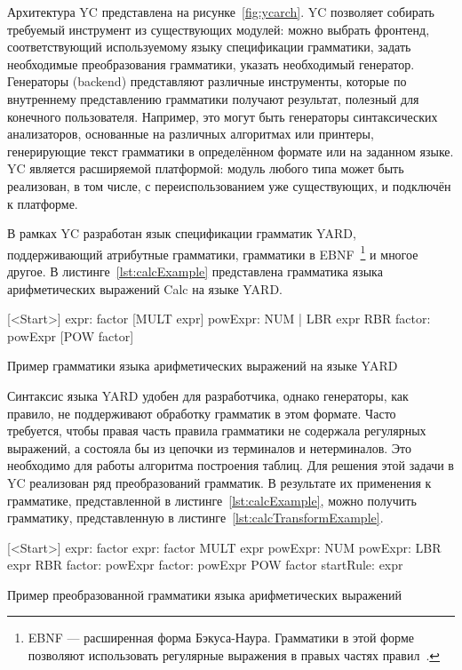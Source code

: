         
    Архитектура YC представлена на рисунке~\ref{fig:ycarch}. YC позволяет собирать требуемый инструмент из существующих модулей: можно выбрать фронтенд, соответствующий используемому языку спецификации грамматики, задать необходимые преобразования грамматики, указать необходимый генератор. Генераторы (backend) представляют различные инструменты, которые по внутреннему представлению грамматики получают результат, полезный для конечного пользователя. Например, это могут быть генераторы синтаксических анализаторов, основанные на различных алгоритмах или принтеры, генерирующие текст грамматики в определённом формате или на заданном языке. YC является расширяемой платформой: модуль любого типа может быть реализован, в том числе, с переиспользованием уже существующих, и подключён к платформе.  

    В рамках YC разработан язык спецификации грамматик YARD, поддерживающий атрибутные грамматики, грамматики в EBNF~\footnote{EBNF --- расширенная форма Бэкуса-Наура. Грамматики в этой форме позволяют использовать регулярные выражения в правых частях правил~\cite{EBNFISO}.} и многое другое. В листинге~\ref{lst:calcExample} представлена грамматика языка арифметических выражений Calc на языке YARD.  

\begin{listing}
    \begin{pyglist}[numbers=left,numbersep=5pt]
    
    [<Start>]
    expr: factor [MULT expr]
    powExpr: NUM | LBR expr RBR
    factor: powExpr [POW factor]
    
\end{pyglist}
\caption{Пример грамматики языка арифметических выражений на языке YARD}
\label{lst:calcExample}
\end{listing}


    Синтаксис языка YARD удобен для разработчика, однако генераторы, как правило, не поддерживают обработку грамматик в этом формате. Часто требуется, чтобы правая часть правила  грамматики не содержала регулярных выражений, а состояла бы из цепочки из терминалов и нетерминалов. Это необходимо для работы алгоритма построения таблиц. Для решения этой задачи в YC реализован ряд преобразований грамматик. В результате их применения к грамматике, представленной в листинге~\ref{lst:calcExample}, можно получить грамматику, представленную в листинге~\ref{lst:calcTransformExample}.


\begin{listing}
    \begin{pyglist}[numbers=left,numbersep=5pt]
    
    [<Start>]
    expr: factor 
    expr: factor MULT expr
    powExpr: NUM 
    powExpr: LBR expr RBR
    factor: powExpr
    factor: powExpr POW factor
    startRule: expr

\end{pyglist}
\caption{Пример преобразованной грамматики языка арифметических выражений}
\label{lst:calcTransformExample}
\end{listing}

